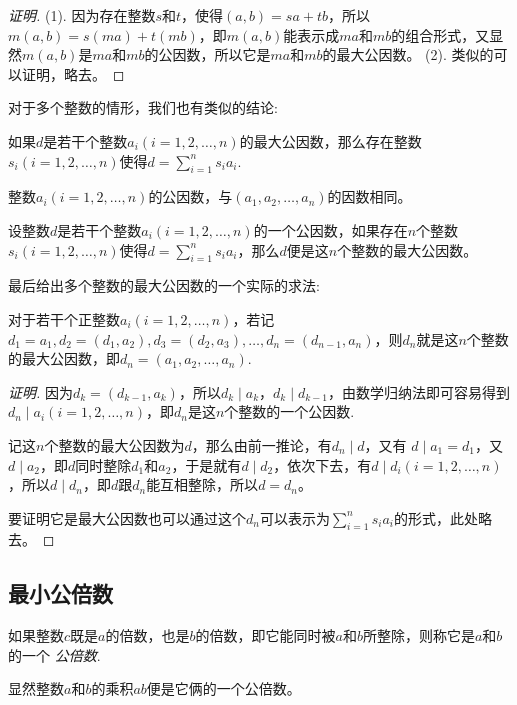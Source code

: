 \begin{proof}[证明]
  (1). 因为存在整数$s$和$t$，使得$(a,b)=sa+tb$，所以$m(a,b)=s(ma)+t(mb)$，即$m(a,b)$能表示成$ma$和$mb$的组合形式，又显然$m(a,b)$是$ma$和$mb$的公因数，所以它是$ma$和$mb$的最大公因数。
  (2). 类似的可以证明，略去。
\end{proof}

对于多个整数的情形，我们也有类似的结论:
\begin{theorem}
  如果$d$是若干个整数$a_i(i=1,2,\ldots,n)$的最大公因数，那么存在整数$s_i(i=1,2,\ldots,n)$使得$d=\sum_{i=1}^n s_ia_i$.
\end{theorem}

\begin{inference}
  整数$a_i(i=1,2,\ldots,n)$的公因数，与$(a_1,a_2,\ldots,a_n)$的因数相同。
\end{inference}

\begin{theorem}
  设整数$d$是若干个整数$a_i(i=1,2,\ldots,n)$的一个公因数，如果存在$n$个整数$s_i(i=1,2,\ldots,n)$使得$d=\sum_{i=1}^n s_ia_i$，那么$d$便是这$n$个整数的最大公因数。
\end{theorem}

最后给出多个整数的最大公因数的一个实际的求法:
\begin{theorem}
  对于若干个正整数$a_i(i=1,2,\ldots,n)$，若记$d_1=a_1, d_2=(d_1,a_2), d_3=(d_2, a_3),\ldots,d_n=(d_{n-1},a_n)$，则$d_n$就是这$n$个整数的最大公因数，即$d_n=(a_1,a_2,\ldots,a_n)$.
\end{theorem}

\begin{proof}[证明]
  因为$d_k=(d_{k-1},a_k)$，所以$d_k \mid a_k$，$d_k \mid d_{k-1}$，由数学归纳法即可容易得到$d_n \mid a_i(i=1,2,\dots,n)$，即$d_n$是这$n$个整数的一个公因数.

  记这$n$个整数的最大公因数为$d$，那么由前一推论，有$d_n \mid d$，又有 $d \mid a_1=d_1$，又$d \mid a_2$，即$d$同时整除$d_1$和$a_2$，于是就有$d \mid d_2$，依次下去，有$d \mid d_i(i=1,2,\ldots,n)$，所以$d \mid d_n$，即$d$跟$d_n$能互相整除，所以$d=d_n$。

  要证明它是最大公因数也可以通过这个$d_n$可以表示为$\sum_{i=1}^n s_ia_i$的形式，此处略去。
\end{proof}

\subsection{最小公倍数}
\label{sec:least-common-multiple}

\begin{definition}
  如果整数$c$既是$a$的倍数，也是$b$的倍数，即它能同时被$a$和$b$所整除，则称它是$a$和$b$的一个 \emph{公倍数}.
\end{definition}
显然整数$a$和$b$的乘积$ab$便是它俩的一个公倍数。

